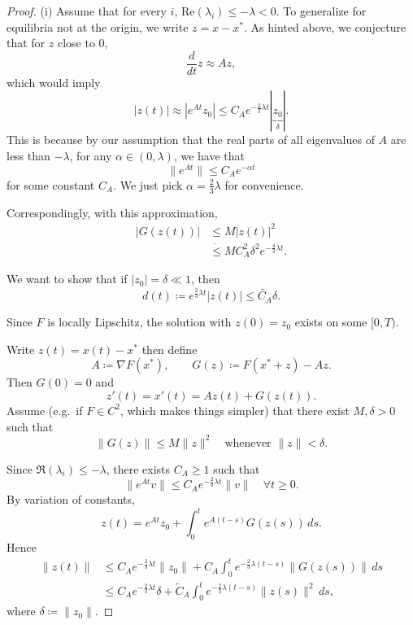 \documentclass{tufte-handout}
\theoremstyle{definition}
\begin{document}
\begin{proof}
	(i) Assume that for every $i$, $\text{Re} (\lambda_i) \le -\lambda < 0$. To generalize for equilibria not at the origin, we write $z = x-x^*$. As hinted above, we conjecture that for $z$ close to $0$, \[
		\frac{d}{dt} z \approx Az
	,\] which would imply \[
		\left| z(t) \right| \approx \left| e^{At}z_0 \right| \le C_A e^{-\frac{2}{3} \lambda t} \left| \underbrace{z_0}_{\delta} \right|
	.\] This is because by our assumption that the real parts of all eigenvalues of $A$ are less than $-\lambda$, for any $\alpha \in (0,\lambda)$, we have that \[
		\|e^{At}\| \le C_A e^{-\alpha t}
	\] for some constant $C_A$. We just pick $\alpha = \frac{2}{3}\lambda$ for convenience.

	Correspondingly, with this approximation,
	\begin{align*}
		\left| G(z(t)) \right|&\le M \left| z(t) \right|^{2} \\
							  &\dot{\le} M C_A^2 \delta^2 e^{-\frac{4}{3}\lambda t}
	.\end{align*}

	We  want to show that if $\left| z_0 \right| = \delta \ll 1$, then \[
		d(t) \coloneqq e^{\frac{2}{3} \lambda t} \left| z(t) \right| \le \tilde{C_A} \delta
	.\] 


	Since $F$ is locally Lipschitz, the solution with $z(0)=z_0$ exists on some
	$[0,T)$.

	Write $z(t) = x(t) - x^*$ then define
	\[
	A \coloneqq \nabla F(x^*), \qquad G(z) \coloneqq F(x^*+z) - Az.
	\]
	Then $G(0)=0$ and
	\[
	z'(t) = x'(t) = Az(t) + G(z(t)).
	\]
	Assume (e.g.\ if $F\in C^2$, which makes things simpler) that there exist $M,\delta>0$ such that
	\[
	\|G(z)\| \le M\|z\|^2 \quad \text{whenever } \|z\|<\delta.
	\]

	Since $\Re(\lambda_i)\le -\lambda$, there exists $C_A\ge 1$ such that
	\[
	\|e^{At}v\| \le C_A e^{-\frac{2}{3}\lambda t}\|v\| \quad \forall t\ge 0.
	\]
	By variation of constants,
	\[
	z(t)=e^{At}z_0 + \int_0^t e^{A(t-s)}G(z(s))\,ds.
	\]
	Hence
	\begin{align*}
	\|z(t)\|
	&\le C_A e^{-\frac{2}{3}\lambda t}\|z_0\|
	 + C_A \int_0^t e^{-\frac{2}{3}\lambda (t-s)} \|G(z(s))\|\,ds \\
	&\le C_A e^{-\frac{2}{3}\lambda t}\delta
	 + \tilde C_A \int_0^t e^{-\frac{2}{3}\lambda (t-s)} \|z(s)\|^2\,ds,
	\end{align*}
	where $\delta\coloneqq\|z_0\|$.


\end{proof}
\end{document}
